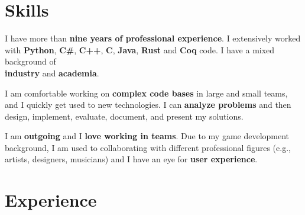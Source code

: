 \documentclass[letterpaper]{twentysecondcv} %
\begin{document}

\makeprofile %


\section{Skills}

I have more than \textbf{nine years of professional experience}. I extensively worked with \textbf{Python}, \textbf{C\#}, \textbf{C++}, \textbf{C}, \textbf{Java}, \textbf{Rust} and \textbf{Coq} code. I have a mixed background of \\\textbf{industry} and \textbf{academia}.

I am comfortable working on \textbf{complex code bases} in large and small teams, and I quickly get used to new technologies. I can \textbf{analyze problems} and then design, implement, evaluate, document, and present my solutions.

I am \textbf{outgoing} and I \textbf{love working in teams}. Due to my game development background, I am used to collaborating with different professional figures (e.g., artists, designers, musicians) and I have an eye for \textbf{user experience}.\\


\section{Experience}
\end{document}
